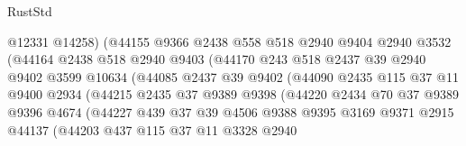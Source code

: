 \begin{lexlean}{RustStd}
\begin{coremodule}
                          @12331
                          @14258)
                        (@44155
                          @9366
                          @2438
                          @558
                          @518
                          @2940
                          @9404
                          @2940
                          @3532
                          (@44164
                            @2438
                            @518
                            @2940
                            @9403
                            (@44170
                              @243
                              @518
                              @2437
                              @39
                              @2940
                              @9402
                              @3599
                              @10634
                              (@44085
                                @2437
                                @39
                                @9402
                                (@44090
                                  @2435
                                  @115
                                  @37
                                  @11
                                  @9400
                                  @2934
                                  (@44215
                                    @2435
                                    @37
                                    @9389
                                    @9398
                                    (@44220
                                      @2434
                                      @70
                                      @37
                                      @9389
                                      @9396
                                      @4674
                                      (@44227
                                        @439
                                        @37
                                        @39
                                        @4506
                                        @9388
                                        @9395
                                        @3169
                                        @9371
                                        @2915
                                        @44137
                                        (@44203
                                          @437
                                          @115
                                          @37
                                          @11
                                          @3328
                                          @2940

\end{coremodule}
\end{lexlean}
